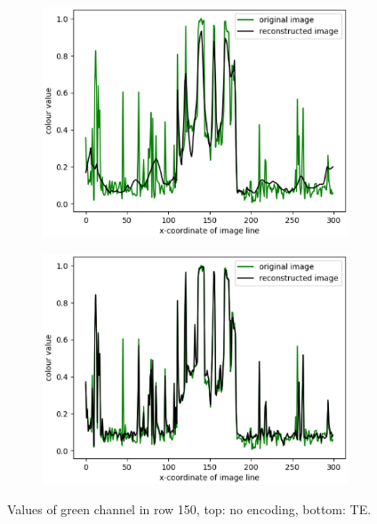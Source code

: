 \begin{figure}
  \begin{subfigure}{0.5\textwidth}
    \includegraphics[width=.85\textwidth]{Bilder/Zeilenanalyse/lines_scale_channel1.eps}
   \end{subfigure}
   \begin{subfigure}{0.5\textwidth}
  \includegraphics[width=.85\textwidth]{Bilder/Zeilenanalyse/lines_tent_channel1.eps}
  \end{subfigure}
  \caption{Values of green channel in row 150, top: no encoding, bottom: TE.}
  \label{lineAnalysis}
\end{figure}

